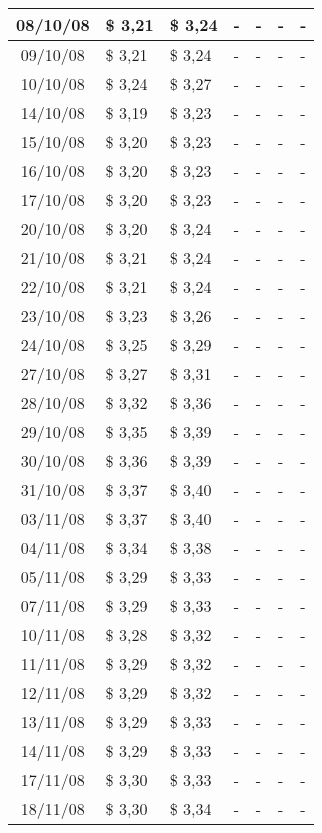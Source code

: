 \begin{center}
\begin{longtable}{|c|p{1.5cm}|p{1.5cm}|p{1.5cm}|p{1.5cm}|p{1.5cm}|p{1.5cm}|}
08/10/08 & \$ 3,21 & \$ 3,24 & - & - & - & - \\ \hline
09/10/08 & \$ 3,21 & \$ 3,24 & - & - & - & - \\ \hline
10/10/08 & \$ 3,24 & \$ 3,27 & - & - & - & - \\ \hline
14/10/08 & \$ 3,19 & \$ 3,23 & - & - & - & - \\ \hline
15/10/08 & \$ 3,20 & \$ 3,23 & - & - & - & - \\ \hline
16/10/08 & \$ 3,20 & \$ 3,23 & - & - & - & - \\ \hline
17/10/08 & \$ 3,20 & \$ 3,23 & - & - & - & - \\ \hline
20/10/08 & \$ 3,20 & \$ 3,24 & - & - & - & - \\ \hline
21/10/08 & \$ 3,21 & \$ 3,24 & - & - & - & - \\ \hline
22/10/08 & \$ 3,21 & \$ 3,24 & - & - & - & - \\ \hline
23/10/08 & \$ 3,23 & \$ 3,26 & - & - & - & - \\ \hline
24/10/08 & \$ 3,25 & \$ 3,29 & - & - & - & - \\ \hline
27/10/08 & \$ 3,27 & \$ 3,31 & - & - & - & - \\ \hline
28/10/08 & \$ 3,32 & \$ 3,36 & - & - & - & - \\ \hline
29/10/08 & \$ 3,35 & \$ 3,39 & - & - & - & - \\ \hline
30/10/08 & \$ 3,36 & \$ 3,39 & - & - & - & - \\ \hline
31/10/08 & \$ 3,37 & \$ 3,40 & - & - & - & - \\ \hline
03/11/08 & \$ 3,37 & \$ 3,40 & - & - & - & - \\ \hline
04/11/08 & \$ 3,34 & \$ 3,38 & - & - & - & - \\ \hline
05/11/08 & \$ 3,29 & \$ 3,33 & - & - & - & - \\ \hline
07/11/08 & \$ 3,29 & \$ 3,33 & - & - & - & - \\ \hline
10/11/08 & \$ 3,28 & \$ 3,32 & - & - & - & - \\ \hline
11/11/08 & \$ 3,29 & \$ 3,32 & - & - & - & - \\ \hline
12/11/08 & \$ 3,29 & \$ 3,32 & - & - & - & - \\ \hline
13/11/08 & \$ 3,29 & \$ 3,33 & - & - & - & - \\ \hline
14/11/08 & \$ 3,29 & \$ 3,33 & - & - & - & - \\ \hline
17/11/08 & \$ 3,30 & \$ 3,33 & - & - & - & - \\ \hline
18/11/08 & \$ 3,30 & \$ 3,34 & - & - & - & - \\ \hline

\end{longtable}
\end{center}
